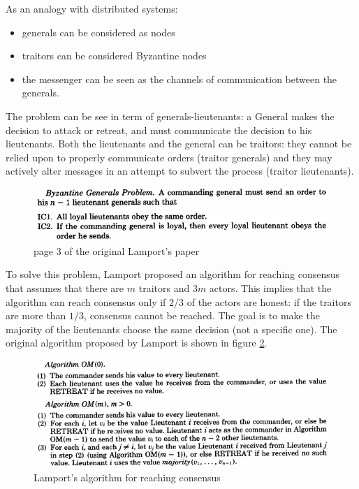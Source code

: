 As an analogy with distributed systems:
\begin{itemize}
  \item generals can be considered as nodes
  \item traitors can be considered Byzantine nodes
  \item the messenger can be seen as the channels of communication between the generals.
\end{itemize}

The problem can be see in term of generals-lieutenants: a General makes the
decision to attack or retreat, and must communicate the decision to his lieutenants.
Both the lieutenants and the general can be traitors: they cannot be relied upon
to properly communicate orders (traitor generals) and they may actively alter
messages in an attempt to subvert the process (traitor lieutenants).
\begin{figure}[!htb]
	\centering
	\includegraphics[width=1\linewidth]{img/byzantine-generals-problem.png}
	\caption{page 3 of the original Lamport's paper \cite{lamport1982byzantine}}
	\label{fig:byzantine-generals-problem}
\end{figure}

To solve this problem, Lamport proposed an algorithm for reaching consensus that
assumes that there are $m$ traitors and $3m$ actors. This implies that the
algorithm can reach consensus only if $2/3$ of the actors are honest: if the
traitors are more than $1/3$, consensus cannot be reached. The goal is
to make the majority of the lieutenants choose the same decision (not a specific one).
The original algorithm proposed by Lamport is shown in figure \ref{fig:lamport-byzantine-algorithm}.
\begin{figure}[!htb]
	\centering
	\includegraphics[width=1\linewidth]{img/lamport-byzantine-algorithm.png}
	\caption{Lamport's algorithm for reaching consensus}
	\label{fig:lamport-byzantine-algorithm}
\end{figure}



